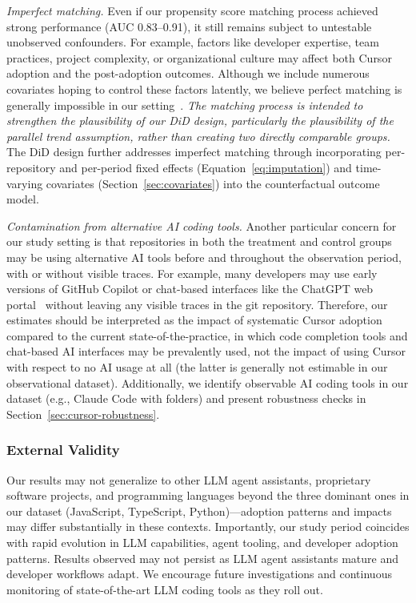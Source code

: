 \emph{Imperfect matching.} 
Even if our propensity score matching process achieved strong performance (AUC 0.83--0.91), it still remains subject to untestable unobserved confounders. 
For example, factors like developer expertise, team practices, project complexity, or organizational culture may affect both Cursor adoption and the post-adoption outcomes. 
Although we include numerous covariates hoping to control these factors latently, we believe perfect matching is generally impossible in our setting~\cite{austin2011introduction}.
\emph{The matching process is intended to strengthen the plausibility of our DiD design, particularly the plausibility of the parallel trend assumption, rather than creating two directly comparable groups.}
The DiD design further addresses imperfect matching through incorporating per-repository and per-period fixed effects (Equation~\ref{eq:imputation}) and time-varying covariates (Section~\ref{sec:covariates}) into the counterfactual outcome model.

\emph{Contamination from alternative AI coding tools.} 
Another particular concern for our study setting is that repositories in both the treatment and control groups may be using alternative AI tools before and throughout the observation period, with or without visible traces.
For example, many developers may use early versions of GitHub Copilot or chat-based interfaces like the ChatGPT web portal~\cite{stackoverflow-survey-ai} without leaving any visible traces in the git repository.
Therefore, our estimates should be interpreted as the impact of systematic Cursor adoption compared to the current state-of-the-practice, in which code completion tools and chat-based AI interfaces may be prevalently used, not the impact of using Cursor with respect to no AI usage at all (the latter is generally not estimable in our observational dataset).
Additionally, we identify observable AI coding tools in our dataset (e.g., Claude Code with  folders) and present robustness checks in Section~\ref{sec:cursor-robustness}.

\subsubsection{External Validity}

Our results may not generalize to other LLM agent assistants, proprietary software projects, and programming languages beyond the three dominant ones in our dataset (JavaScript, TypeScript, Python)---adoption patterns and impacts may differ substantially in these contexts. Importantly, our study period coincides with rapid evolution in LLM capabilities, agent tooling, and developer adoption patterns. Results observed may not persist as LLM agent assistants mature and developer workflows adapt. We encourage future investigations and continuous monitoring of state-of-the-art LLM coding tools as they roll out.

